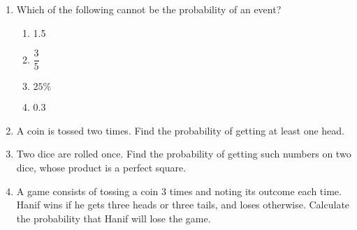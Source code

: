 
\begin{enumerate}
    \item Which of the following cannot be the probability of an event?
    \begin{enumerate}
        \item 1.5
        \item $\dfrac{3}{5}$
        \item $25\%$
        \item 0.3
    \end{enumerate}
    \item A coin is tossed two times. Find the probability of getting at least one head.
    \item Two dice are rolled once. Find the probability of getting such numbers on two dice, whose product is a perfect square.
    \item A game consists of tossing a coin 3 times and noting its outcome each time. Hanif wins if he gets three heads or three tails, and loses otherwise. Calculate the probability that Hanif will lose the game.
\end{enumerate}
